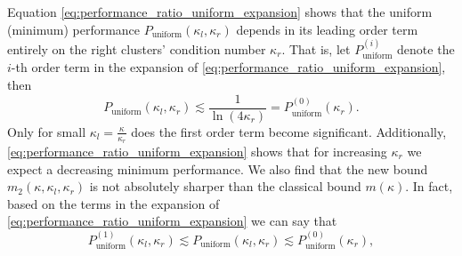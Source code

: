 Equation \ref{eq:performance_ratio_uniform_expansion} shows that the uniform (minimum) performance $P_{\text{uniform}}(\kappa_l, \kappa_r)$ depends in its leading order term entirely on the right clusters' condition number $\kappa_r$. That is, let $P^{(i)}_{\text{uniform}}$ denote the $i$-th order term in the expansion of \cref{eq:performance_ratio_uniform_expansion}, then
\[
    P_{\text{uniform}}(\kappa_l, \kappa_r) \lesssim \frac{1}{\ln(4\kappa_r)} = P^{(0)}_{\text{uniform}}(\kappa_r).
\]
Only for small $\kappa_l = \frac{\kappa}{\kappa_r}$ does the first order term become significant. Additionally, \cref{eq:performance_ratio_uniform_expansion} shows that for increasing $\kappa_r$ we expect a decreasing minimum performance. We also find that the new bound $m_2(\kappa,\kappa_l,\kappa_r)$ is not absolutely sharper than the classical bound $m(\kappa)$. In fact, based on the terms in the expansion of \cref{eq:performance_ratio_uniform_expansion} we can say that
\begin{equation}
    P^{(1)}_{\text{uniform}}(\kappa_l, \kappa_r) \lesssim P_{\text{uniform}}(\kappa_l, \kappa_r) \lesssim P^{(0)}_{\text{uniform}}(\kappa_r),
    \label{eq:performance_ratio_no_improvement_bounds}
\end{equation}

